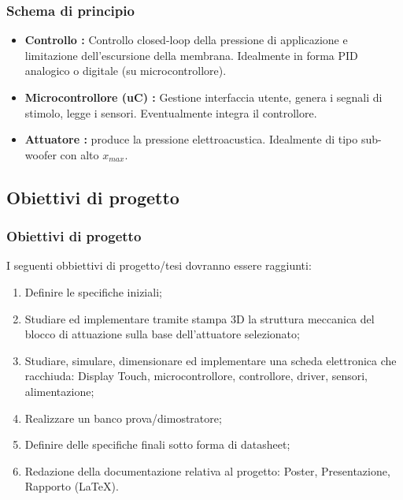 \begin{frame}[fragile]
\frametitle{Schema di principio}
\begin{itemize}{}{}
\item \textbf{Controllo :} Controllo closed-loop della pressione di applicazione e limitazione dell'escursione della membrana. Idealmente in forma PID analogico o digitale (su microcontrollore).
\item \textbf{Microcontrollore (uC) :} Gestione interfaccia utente, genera i segnali di stimolo, legge i sensori. Eventualmente integra il controllore.
\item \textbf{Attuatore :} produce la pressione elettroacustica. Idealmente di tipo sub-woofer con alto $x_{max}$.
\end{itemize}
\end{frame}

\subsection{Obiettivi di progetto}
\begin{frame}[fragile]
\frametitle{Obiettivi di progetto}
I seguenti obbiettivi di progetto/tesi dovranno essere raggiunti:
\begin{enumerate}{}{}
\item{Definire le specifiche iniziali;}
\item{Studiare ed implementare tramite stampa 3D la struttura meccanica del blocco di attuazione sulla base dell'attuatore selezionato;}
\item{Studiare, simulare, dimensionare ed implementare una scheda elettronica che racchiuda: Display Touch, microcontrollore, controllore, driver, sensori, alimentazione;}
\item{Realizzare un banco prova/dimostratore;}
\item{Definire delle specifiche finali sotto forma di datasheet;}
\item{Redazione della documentazione relativa al progetto: Poster, Presentazione, Rapporto (\LaTeX).}
\end{enumerate}
\end{frame}

